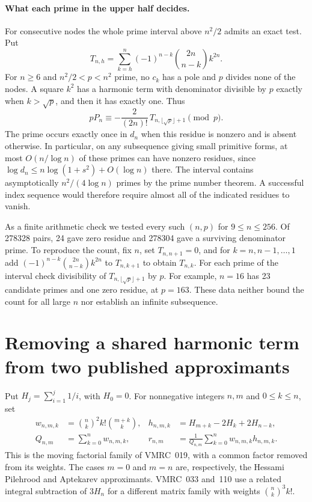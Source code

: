\documentclass[11pt,a4paper,oneside,openany]{report}
\theoremstyle{remark}\newtheorem{remark}[theorem]{Remark}
\numberwithin{equation}{section}
\begin{document}
\paragraph{What each prime in the upper half decides.}
For consecutive nodes the whole prime interval above $n^2/2$ admits an exact test. Put
\[
 T_{n,h}=\sum_{k=h}^n(-1)^{n-k}\binom{2n}{n-k}k^{2n}.
\]
For $n\ge6$ and $n^2/2<p<n^2$ prime, no $c_k$ has a pole and $p$ divides none of the nodes. A square $k^2$ has a harmonic term with denominator divisible by $p$ exactly when $k>\sqrt p$, and then it has exactly one. Thus
\[
 pP_n\equiv-\frac{2}{(2n)!}\,T_{n,\lfloor\sqrt p\rfloor+1}\pmod p .
\]
The prime occurs exactly once in $d_n$ when this residue is nonzero and is absent otherwise. In particular, on any subsequence giving small primitive forms, at most $O(n/\log n)$ of these primes can have nonzero residues, since $\log d_n\le n\log(1+s^2)+O(\log n)$ there. The interval contains asymptotically $n^2/(4\log n)$ primes by the prime number theorem. A successful index sequence would therefore require almost all of the indicated residues to vanish.

As a finite arithmetic check we tested every such $(n,p)$ for $9\le n\le256$. Of 278328 pairs, 24 gave zero residue and 278304 gave a surviving denominator prime. To reproduce the count, fix $n$, set $T_{n,n+1}=0$, and for $k=n,n-1,\ldots,1$ add $(-1)^{n-k}\binom{2n}{n-k}k^{2n}$ to $T_{n,k+1}$ to obtain $T_{n,k}$. For each prime of the interval check divisibility of $T_{n,\lfloor\sqrt p\rfloor+1}$ by $p$. For example, $n=16$ has 23 candidate primes and one zero residue, at $p=163$. These data neither bound the count for all large $n$ nor establish an infinite subsequence.

\section{Removing a shared harmonic term from two published approximants}
\label{ch3:sh3:section}

Put $H_j=\sum_{i=1}^j1/i$, with $H_0=0$. For nonnegative integers
$n,m$ and $0\le k\le n$, set
\begin{align*}
 w_{n,m,k}&=\binom nk^2 k!\binom{m+k}{k},&
 h_{n,m,k}&=H_{m+k}-2H_k+2H_{n-k},\\
 Q_{n,m}&=\sum_{k=0}^n w_{n,m,k},&
 r_{n,m}&=\frac1{Q_{n,m}}\sum_{k=0}^n w_{n,m,k}h_{n,m,k}.
\end{align*}
This is the moving factorial family of VMRC~019, with a common
factor removed from its weights. The cases $m=0$ and $m=n$ are,
respectively, the Hessami Pilehrood and Aptekarev approximants.
VMRC~033 and~110 use a related integral subtraction of $3H_n$
for a different matrix family with weights $\binom nk^3 k!$.
\end{document}

